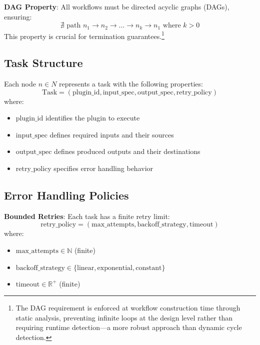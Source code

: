 \textbf{DAG Property}: All workflows must be directed acyclic graphs (DAGs), ensuring:
\begin{equation}
\nexists \text{ path } n_1 \to n_2 \to \ldots \to n_k \to n_1 \text{ where } k > 0
\end{equation}
This property is crucial for termination guarantees.\footnote{The DAG requirement is enforced at workflow construction time through static analysis, preventing infinite loops at the design level rather than requiring runtime detection—a more robust approach than dynamic cycle detection.}

\newpage

\subsection{Task Structure}

Each node $n \in N$ represents a task with the following properties:
\begin{equation}
\text{Task} = (\text{plugin\_id}, \text{input\_spec}, \text{output\_spec}, \text{retry\_policy})
\end{equation}
where:
\begin{itemize}
\item $\text{plugin\_id}$ identifies the plugin to execute
\item $\text{input\_spec}$ defines required inputs and their sources
\item $\text{output\_spec}$ defines produced outputs and their destinations
\item $\text{retry\_policy}$ specifies error handling behavior
\end{itemize}

\subsection{Error Handling Policies}

\textbf{Bounded Retries}: Each task has a finite retry limit:
\begin{equation}
\text{retry\_policy} = (\text{max\_attempts}, \text{backoff\_strategy}, \text{timeout})
\end{equation}
where:
\begin{itemize}
\item $\text{max\_attempts} \in \mathbb{N}$ (finite)
\item $\text{backoff\_strategy} \in \{\text{linear}, \text{exponential}, \text{constant}\}$
\item $\text{timeout} \in \mathbb{R}^+$ (finite)
\end{itemize}

